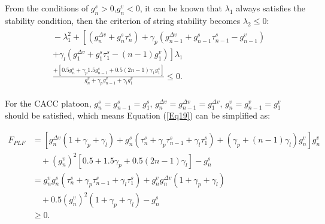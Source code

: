 \documentclass[journal]{IEEEtran}
\begin{document}
From the conditions of $g_n^s>0$,$g_n^v<0$, it can be known that $\lambda_1$ always satisfies the stability condition, then the criterion of string stability becomes $\lambda_2\leq0$:
\begin{equation}
  \begin{gathered}
    \begin{aligned}
       & \!-\!\lambda_{1}^{2}\!+\!\left[\left(g_{n}^{\Delta v}\!+\!g_{n}^{s} \tau_{n}^{s}\right)\!+\!\gamma_{p}\left(g_{n\!-\!1}^{\Delta v}\!+\!g_{n\!-\!1}^{s} \tau_{n\!-\!1}^{s}\!-\!g_{n\!-\!1}^{v}\right)\right. \\
       & \left.+\gamma_{l}\left(g_{1}^{\Delta v}\!+\!g_{1}^{s} \tau_{1}^{s}\!-\!(n\!-\!1) g_{1}^{v}\right)\right] \lambda_{1}                                                                                        \\
       & \frac{+\left[0.5 g_{n}^{s}\!+\!\gamma_{p} 1.5 g_{n\!-\!1}^{s}\!+\!0.5(2 n\!-\!1) \gamma_{1} g_{1}^{s}\right]}{g_{n}^{v}\!+\!\gamma_{p} g_{n\!-\!1}^{v}\!+\!\gamma_{l} g_{1}^{v}} \leq 0.
    \end{aligned}
  \end{gathered}
  \label{Eq19}
\end{equation}


For the CACC platoon, $g_n^s=g_{n-1}^s=g_1^s$, $g_n^{\Delta v}=g_{n-1}^{\Delta v}=g_1^{\Delta v}$, $g_n^v=g_{n-1}^v=g_1^v$ should be satisfied, which means Equation (\ref{Eq19}) can be simplified as:
\begin{small}
  \begin{equation}
    \begin{aligned}
      F_{PLF} & =\left[g_{n}^{\Delta v}\left(1\!+\!\gamma_{p}\!+\!\gamma_{l}\right)\!+\!g_{n}^{s}\left(\tau_{n}^{s}\!+\!\gamma_{p} \tau_{n\!-\!1}^{s}\!+\!\gamma_{l} \tau_{1}^{s}\right)\!+\!\left(\gamma_{p}\!+\!(n\!\!-\!\!1) \gamma_{l}\right) g_{n}^{v}\right] g_{n}^{v} \\
              & \quad+\!\left(g_{n}^{v}\right)^{2}\left[0.5\!+\!1.5 \gamma_{p}\!+\!0.5(2 n\!-\!1) \gamma_{l}\right]\!\!-\!g_{n}^{s}\!                                                                                                                                        \\
              & =g_{n}^{v} g_{n}^{s}\left(\tau_{n}^{s}\!+\!\gamma_{p} \tau_{n\!-\!1}^{s}\!+\!\gamma_{l} \tau_{1}^{s}\right)\!+\!g_{n}^{v} g_{n}^{\Delta v}\left(1\!+\!\gamma_{p}\!+\!\gamma_{l}\right)                                                                       \\
              & \quad \!+\!0.5\left(g_{n}^{v}\right)^{2}\left(1\!+\!\gamma_{p}\!+\!\gamma_{l}\right)\!-\!g_{n}^{s}                                                                                                                                                           \\
              & \geq 0.
    \end{aligned}
    \label{Eq70}
  \end{equation}
\end{small}
\end{document}

